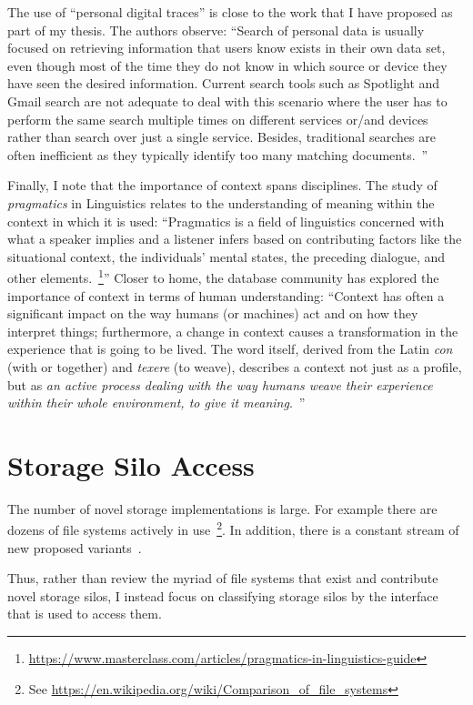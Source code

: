 The use of ``personal digital traces'' is close to the work that I have proposed
as part of my thesis.  The authors observe: ``Search of personal data is usually focused on retrieving information
that users know exists in their own data set, even though most
of the time they do not know in which source or device they have
seen the desired information. Current search tools such as Spotlight
and Gmail search are not adequate to deal with this scenario where
the user has to perform the same search multiple times on different
services or/and devices rather than search over just a single service.
Besides, traditional searches are often inefficient as they typically
identify too many matching documents.~\cite{vianna2019searching}''

Finally, I note that the importance of context spans disciplines.  The study of
\emph{pragmatics} in Linguistics relates to the understanding of meaning within
the context in which it is used: ``Pragmatics is a field of linguistics
concerned with what a speaker implies and a listener infers based on
contributing factors like the situational context, the individuals’ mental
states, the preceding dialogue, and other
elements.~\footnote{\url{https://www.masterclass.com/articles/pragmatics-in-linguistics-guide}}''
Closer to home, the database community has explored the importance of
context in terms of human understanding: ``Context has often a significant
impact on the way humans (or machines) act and on how they
interpret things; furthermore, a change in context causes a
transformation in the experience that is going to be lived.
The word itself, derived from the Latin \emph{con} (with or together) and
\emph{texere} (to weave), describes a context not just
as a profile, but as \emph{an active process dealing with the way
    humans weave their experience within their whole environment, to give it
    meaning}.~\cite{bolchini2007data}''

\section{Storage Silo Access}
\label{ch:background:sec:storage-silos}

The number of novel storage implementations is large.  For example there are dozens of file
systems actively in use~\footnote{See
    \url{https://en.wikipedia.org/wiki/Comparison_of_file_systems}}. In addition,
there is a constant stream of new proposed
variants~\cite{10.1145/3477113.3487265,kadekodi2021winefs}.

Thus, rather than review the myriad of file systems that exist and contribute
novel storage silos, I instead focus on classifying storage silos by the
interface that is used to access them.

